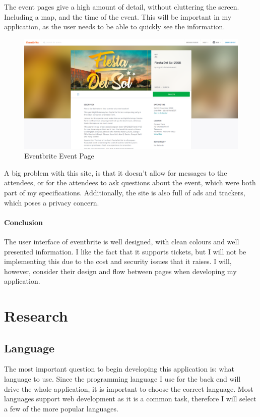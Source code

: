\documentclass[12pt, draft]{report}
\begin{document}
	The event pages give a high amount of detail, without cluttering the screen. Including a map, and the time of the event. This will be important in my application, as the user needs to be able to quickly see the information.

	\begin{figure}[H]
		\caption{Eventbrite Event Page}
		\includegraphics[width=\linewidth]{static/eventbrite-event.png}
	\end{figure}

	A big problem with this site, is that it doesn't allow for messages to the attendees, or for the attendees to ask questions about the event, which were both part of my specifications. Additionally, the site is also full of ads and trackers, which poses a privacy concern.

	\subsubsection{Conclusion}
	The user interface of eventbrite is well designed, with clean colours and well presented information. I like the fact that it supports tickets, but I will not be implementing this due to the cost and security issues that it raises. I will, however, consider their design and flow between pages when developing my application.


	\chapter{Research}

	\section{Language}
	The most important question to begin developing this application is: what language to use. Since the programming language I use for the back end will drive the whole application, it is important to choose the correct language. Most languages support web development as it is a common task, therefore I will select a few of the more popular languages.
\end{document}
